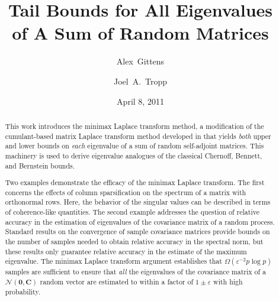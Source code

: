\documentclass[11pt,letterpaper,twoside,reqno,nosumlimits]{amsart}
\title[Tail Bounds for Eigenvalues of Random Matrices]{Tail Bounds for All Eigenvalues \\ of A Sum of Random Matrices}
\date{April 8, 2011}
\author[A.~Gittens]{Alex~Gittens}
\author[J.~A.~Tropp]{Joel~A.~Tropp}
\newcommand{\mat}[1]{\ensuremath{\bm{#1}}} %
\renewcommand{\vec}[1]{\ensuremath{\bm{#1}}}
\theoremstyle{remark}
\numberwithin{equation}{section}
\numberwithin{thm}{section}
\numberwithin{prop}{section}
\numberwithin{defn}{section}
\numberwithin{remark}{section}
\begin{document}
\begin{abstract}
This work introduces the minimax Laplace transform method, a modification of the cumulant-based matrix Laplace transform method developed in \cite{T10a} that yields \emph{both} upper and lower bounds on \emph{each} eigenvalue of a sum of random self-adjoint matrices. This machinery is used to derive eigenvalue analogues of the classical Chernoff, Bennett, and Bernstein bounds.

Two examples demonstrate the efficacy of the minimax Laplace transform. The first concerns the effects of column sparsification on the spectrum of a matrix with orthonormal rows. Here, the behavior of the singular values can be described in terms of coherence-like quantities. The second example addresses the question of relative accuracy in the estimation of eigenvalues of the covariance matrix of a random process. Standard results on the convergence of sample covariance matrices provide bounds on the number of samples needed to obtain relative accuracy in the spectral norm, but these results only guarantee relative accuracy in the estimate of the maximum eigenvalue. The minimax Laplace transform argument establishes that $\Omega(\varepsilon^{-2} p \log p)$ samples are sufficient to ensure that \emph{all} the eigenvalues of the covariance matrix of a $\mathcal{N}(\vec{0}, \mat{C})$ random vector are estimated to within a factor of $1 \pm \varepsilon$ with high probability.


\end{abstract}
\end{document}
